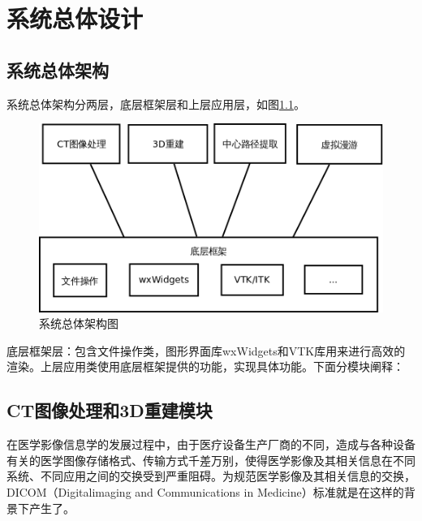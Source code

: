 \chapter{系统总体设计}
\label{chapter-general_design}

\section{系统总体架构}
系统总体架构分两层，底层框架层和上层应用层，如图\ref{structure}。
\begin{figure}[h!]
    \centering
    \includegraphics[width=350bp]{figure/structure.png}
    \caption{系统总体架构图}
    \label{structure}
\end{figure}

底层框架层：包含文件操作类，图形界面库wxWidgets和VTK库用来进行高效的渲染。上层应用类使用底层框架提供的功能，实现具体功能。下面分模块阐释：
\section{CT图像处理和3D重建模块}
在医学影像信息学的发展过程中，由于医疗设备生产厂商的不同，造成与各种设备有关的医学图像存储格式、传输方式千差万别，使得医学影像及其相关信息在不同系统、不同应用之间的交换受到严重阻碍。为规范医学影像及其相关信息的交换， DICOM（Digitalimaging and Communications in Medicine）标准就是在这样的背景下产生了。

